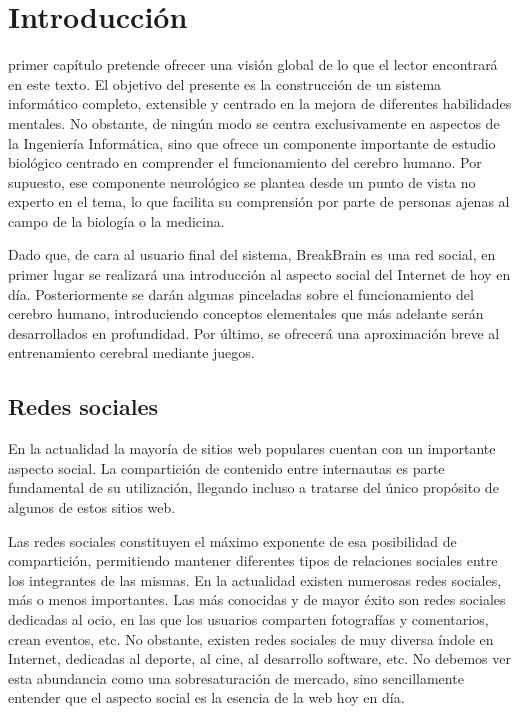 \chapter{Introducción}
\label{chap:introduccion}

 primer capítulo pretende ofrecer una visión global de lo que el lector encontrará en este texto. El objetivo del presente es la construcción de un sistema informático completo, extensible y centrado en la mejora de diferentes habilidades mentales. No obstante, de ningún modo se centra exclusivamente en aspectos de la Ingeniería Informática, sino que ofrece un componente importante de estudio biológico centrado en comprender el funcionamiento del cerebro humano. Por supuesto, ese componente neurológico se plantea desde un punto de vista no experto en el tema, lo que facilita su comprensión por parte de personas ajenas al campo de la biología o la medicina.

Dado que, de cara al usuario final del sistema, BreakBrain es una red social, en primer lugar se realizará una introducción al aspecto social del Internet de hoy en día. Posteriormente se darán algunas pinceladas sobre el funcionamiento del cerebro humano, introduciendo conceptos elementales que más adelante serán desarrollados en profundidad. Por último, se ofrecerá una aproximación breve al entrenamiento cerebral mediante juegos.


\section{Redes sociales}

En la actualidad la mayoría de sitios web populares cuentan con un importante aspecto social. La compartición de contenido entre internautas es parte fundamental de su utilización, llegando incluso a tratarse del único propósito de algunos de estos sitios web.

Las redes sociales constituyen el máximo exponente de esa posibilidad de compartición, permitiendo mantener diferentes tipos de relaciones sociales entre los integrantes de las mismas. En la actualidad existen numerosas redes sociales, más o menos importantes. Las más conocidas y de mayor éxito son redes sociales dedicadas al ocio, en las que los usuarios comparten fotografías y comentarios, crean eventos, etc. No obstante, existen redes sociales de muy diversa índole en Internet, dedicadas al deporte, al cine, al desarrollo software, etc. No debemos ver esta abundancia como una sobresaturación de mercado, sino sencillamente entender que el aspecto social es la esencia de la web hoy en día.

